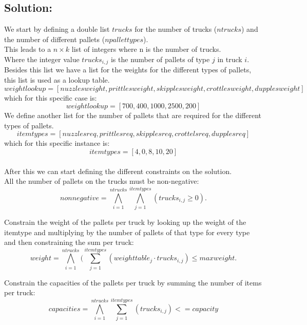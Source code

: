 \documentclass[12pt]{article}
\begin{document}
\vspace{8mm}

\newpage

\subsection*{Solution:}

We start by defining a double list $trucks$ for the number of trucks ($ntrucks$) and the number of different pallets ($npallettypes$). \\
This leads to a $n \times k$ list of integers where n is the number of trucks. \\
 Where the integer value $ trucks_{i,j} $ is the number of pallets of type $j$ in truck $i$. \\

Besides this list we have a list for the weights for the different types of pallets, this list is used as a lookup table. \\
\[ weightlookup = [nuzzlesweight, prittlesweight, skipplesweight, crottlesweight, dupplesweight] \]
which for this specific case is:
\[ weightlookup = [700, 400, 1000, 2500, 200] \]
We define another list for the number of pallets that are required for the different types of pallets.\\
\[ itemtypes = [nuzzlesreq, prittlesreq, skipplesreq, crottelsreq, dupplesreq] \]
which for this specific instance is:
\[ itemtypes = [4, 0, 8, 10, 20] \] \\

After this we can start defining the different constraints on the solution.\\

All the number of pallets on the trucks must be non-negative: \\
\[ nonnegative = \bigwedge_{i=1}^{ntrucks} \bigwedge_{j=1}^{itemtypes} (trucks_{i,j} \geq 0). \]

Constrain the weight of the pallets per truck by looking up the weight of the itemtype and multiplying by the number of pallets of that type for every type and then constraining the sum per truck: \\
\[ weight = \bigwedge_{i=1}^{ntrucks} ( \sum_{j=1}^{itemtypes} (weighttable_j \cdot trucks_{i,j} ) \leq maxweight. \]

Constrain the capacities of the pallets per truck by summing the number of items per truck: \\
\[ capacities = \bigwedge_{i=1}^{ntrucks} \sum_{j=1}^{itemtypes} ( trucks_{i,j} ) <= capacity \]
\end{document}
